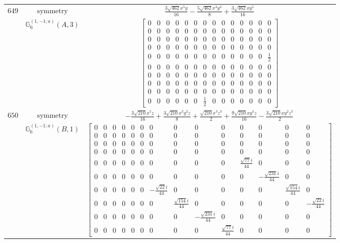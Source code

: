 \documentclass[fleqn,8pt,landscape]{jsarticle}
\begin{document}
\begin{longtable}{ccc}
$ 649 $ & $ \text{symmetry} $ & $ \frac{3 \sqrt{462} x^{5} y}{16} - \frac{5 \sqrt{462} x^{3} y^{3}}{8} + \frac{3 \sqrt{462} x y^{5}}{16} $ \\
$  $ & $ \mathbb{G}_{6}^{(1,-1;a)}(A,3) $ & $ \begin{bmatrix} 0 & 0 & 0 & 0 & 0 & 0 & 0 & 0 & 0 & 0 & 0 & 0 & 0 & 0 \\ 0 & 0 & 0 & 0 & 0 & 0 & 0 & 0 & 0 & 0 & 0 & 0 & 0 & 0 \\ 0 & 0 & 0 & 0 & 0 & 0 & 0 & 0 & 0 & 0 & 0 & 0 & 0 & 0 \\ 0 & 0 & 0 & 0 & 0 & 0 & 0 & 0 & 0 & 0 & 0 & 0 & 0 & 0 \\ 0 & 0 & 0 & 0 & 0 & 0 & 0 & 0 & 0 & 0 & 0 & 0 & 0 & \frac{1}{2} \\ 0 & 0 & 0 & 0 & 0 & 0 & 0 & 0 & 0 & 0 & 0 & 0 & 0 & 0 \\ 0 & 0 & 0 & 0 & 0 & 0 & 0 & 0 & 0 & 0 & 0 & 0 & 0 & 0 \\ 0 & 0 & 0 & 0 & 0 & 0 & 0 & 0 & 0 & 0 & 0 & 0 & 0 & 0 \\ 0 & 0 & 0 & 0 & 0 & 0 & 0 & 0 & 0 & 0 & 0 & 0 & 0 & 0 \\ 0 & 0 & 0 & 0 & 0 & 0 & \frac{1}{2} & 0 & 0 & 0 & 0 & 0 & 0 & 0 \end{bmatrix} $ \\ \hline
$ 650 $ & $ \text{symmetry} $ & $ - \frac{3 \sqrt{210} x^{5} z}{16} + \frac{3 \sqrt{210} x^{3} y^{2} z}{8} + \frac{\sqrt{210} x^{3} z^{3}}{2} + \frac{9 \sqrt{210} x y^{4} z}{16} - \frac{3 \sqrt{210} x y^{2} z^{3}}{2} $ \\
$  $ & $ \mathbb{G}_{6}^{(1,-1;a)}(B,1) $ & $ \begin{bmatrix} 0 & 0 & 0 & 0 & 0 & 0 & 0 & 0 & 0 & 0 & 0 & 0 & 0 & 0 \\ 0 & 0 & 0 & 0 & 0 & 0 & 0 & 0 & 0 & 0 & 0 & 0 & 0 & 0 \\ 0 & 0 & 0 & 0 & 0 & 0 & 0 & 0 & 0 & 0 & 0 & 0 & 0 & 0 \\ 0 & 0 & 0 & 0 & 0 & 0 & 0 & 0 & 0 & 0 & 0 & 0 & 0 & 0 \\ 0 & 0 & 0 & 0 & 0 & 0 & 0 & 0 & 0 & 0 & \frac{\sqrt{77} i}{44} & 0 & 0 & 0 \\ 0 & 0 & 0 & 0 & 0 & 0 & 0 & 0 & 0 & 0 & 0 & - \frac{\sqrt{231} i}{44} & 0 & 0 \\ 0 & 0 & 0 & 0 & 0 & 0 & - \frac{\sqrt{22} i}{44} & 0 & 0 & 0 & 0 & 0 & \frac{\sqrt{154} i}{44} & 0 \\ 0 & 0 & 0 & 0 & 0 & 0 & 0 & \frac{\sqrt{154} i}{44} & 0 & 0 & 0 & 0 & 0 & - \frac{\sqrt{22} i}{44} \\ 0 & 0 & 0 & 0 & 0 & 0 & 0 & 0 & - \frac{\sqrt{231} i}{44} & 0 & 0 & 0 & 0 & 0 \\ 0 & 0 & 0 & 0 & 0 & 0 & 0 & 0 & 0 & \frac{\sqrt{77} i}{44} & 0 & 0 & 0 & 0 \end{bmatrix} $ \\ \hline

\end{longtable}
\end{document}
